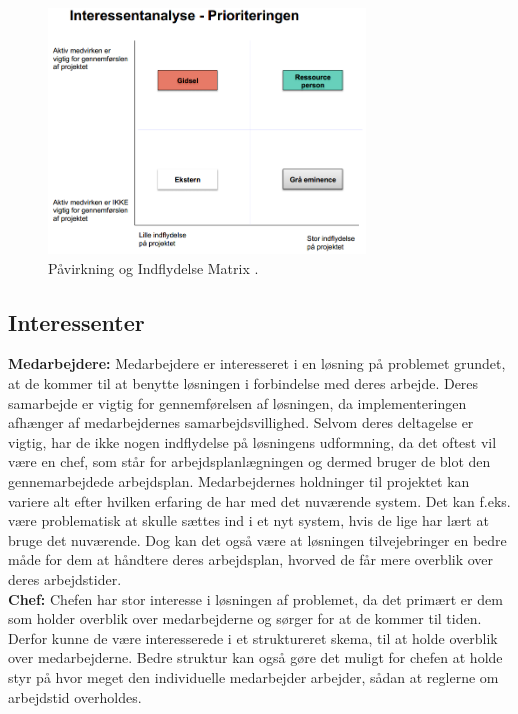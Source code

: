 \begin{figure}[h]
    \centering
    \includegraphics[width=0.75\textwidth]{figures/Udklip.PNG}
    \caption{Påvirkning og Indflydelse Matrix \citep{Holgaard2014}.} 
    \label{fig:PåvirkInflydMat}
\end{figure}

\subsection{Interessenter}
\textbf{Medarbejdere:}
Medarbejdere er interesseret i en løsning på problemet grundet, at de kommer til at benytte løsningen i forbindelse med deres arbejde. Deres samarbejde er vigtig for gennemførelsen af løsningen, da implementeringen afhænger af medarbejdernes samarbejdsvillighed. Selvom deres deltagelse er vigtig, har de ikke nogen indflydelse på løsningens udformning, da det oftest vil være en chef, som står for arbejdsplanlægningen og dermed bruger de blot den gennemarbejdede arbejdsplan. Medarbejdernes holdninger til projektet kan variere alt efter hvilken erfaring de har med det nuværende system. Det kan f.eks. være problematisk at skulle sættes ind i et nyt system, hvis de lige har lært at bruge det nuværende. Dog kan det også være at løsningen tilvejebringer en bedre måde for dem at håndtere deres arbejdsplan, hvorved de får mere overblik over deres arbejdstider.\\

\textbf{Chef:}
Chefen har stor interesse i løsningen af problemet, da det primært er dem som holder overblik over medarbejderne og sørger for at de kommer til tiden. Derfor kunne de være interesserede i et struktureret skema, til at holde overblik over medarbejderne. Bedre struktur kan også gøre det muligt for chefen at holde styr på hvor meget den individuelle medarbejder arbejder, sådan at reglerne om arbejdstid overholdes.\\

